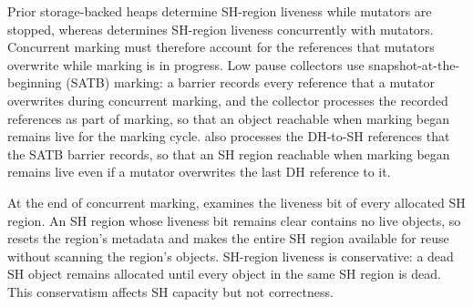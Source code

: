 Prior storage-backed heaps determine SH-region liveness while mutators are stopped, whereas \chipperName{} determines SH-region liveness concurrently with mutators.
Concurrent marking must therefore account for the references that mutators overwrite while marking is in progress.
Low pause collectors use snapshot-at-the-beginning (SATB) marking: a barrier records every reference that a mutator overwrites during concurrent marking, and the collector processes the recorded references as part of marking, so that an object reachable when marking began remains live for the marking cycle.
\chipperName{} also processes the DH-to-SH references that the SATB barrier records, so that an SH region reachable when marking began remains live even if a mutator overwrites the last DH reference to it.

At the end of concurrent marking, \chipperName{} examines the liveness bit of every allocated SH region.
An SH region whose liveness bit remains clear contains no live objects, so \chipperName{} resets the region's metadata and makes the entire SH region available for reuse without scanning the region's objects.
SH-region liveness is conservative: a dead SH object remains allocated until every object in the same SH region is dead.
This conservatism affects SH capacity but not correctness.
